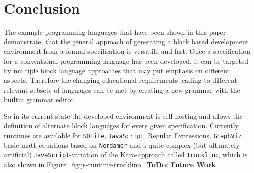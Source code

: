 \documentclass[sigconf,natbib=false,review=true,anonymous]{acmart}
\newcommand\todo[1]{{\bfseries ToDo: #1}}
\begin{document}
\section{Conclusion}

The example programming languages that have been shown in this paper demonstrate, that the general approach of generating a block based development environment from a formal specification is versatile and fast. Once a specification for a conventional programming language has been developed, it can be targeted by multiple block language approaches that may put emphasis on different aspects. Therefore the changing educational requirements leading to different relevant subsets of languages can be met by creating a new grammar with the builtin grammar editor.

So in its current state the developed environment is self-hosting and allows the definition of alternate block languages for every given specification. Currently runtimes are available for \texttt{SQLite}, \texttt{JavaScript}, Regular Expressions, \texttt{GraphViz}, basic math equations based on \texttt{Nerdamer} and a quite complex (but ultimately artificial) \texttt{JavaScript}-variation of the Kara-approach called \texttt{Trucklino}\cite{popp_konzeption_2019}, which is also shown in Figure~\ref{fig:js-runtime-trucklino}.
\todo{Future Work}
\printbibliography
\end{document}
